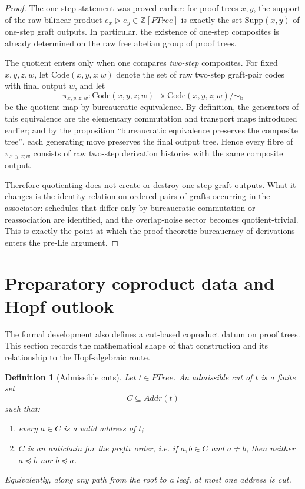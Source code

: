 \documentclass[11pt]{article}
\newtheorem{definition}[theorem]{Definition}
\newcommand{\PTree}{\mathit{PTree}}
\newcommand{\Addr}{\mathit{Addr}}
\begin{document}
\begin{proof}
The one-step statement was proved earlier: for proof trees \(x,y\), the support
of the raw bilinear product \(e_x\triangleright e_y\in \mathbb Z[\PTree]\) is
exactly the set \(\mathrm{Supp}(x,y)\) of one-step graft outputs. In
particular, the existence of one-step composites is already determined on the
raw free abelian group of proof trees.

The quotient enters only when one compares \emph{two-step} composites. For
fixed \(x,y,z,w\), let \(\mathrm{Code}(x,y,z;w)\) denote the set of raw
two-step graft-pair codes with final output \(w\), and let
\[
\pi_{x,y,z;w}:\mathrm{Code}(x,y,z;w)\twoheadrightarrow
\mathrm{Code}(x,y,z;w)/{\sim_{\mathrm b}}
\]
be the quotient map by bureaucratic equivalence. By definition, the generators
of this equivalence are the elementary commutation and transport maps introduced
earlier; and by the proposition ``bureaucratic equivalence preserves the
composite tree'', each generating move preserves the final output tree. Hence
every fibre of \(\pi_{x,y,z;w}\) consists of raw two-step derivation histories
with the same composite output.

Therefore quotienting does not create or destroy one-step graft outputs. What it
changes is the identity relation on ordered pairs of grafts occurring in the
associator: schedules that differ only by bureaucratic commutation or
reassociation are identified, and the overlap-noise sector becomes
quotient-trivial. This is exactly the point at which the proof-theoretic
bureaucracy of derivations enters the pre-Lie argument.
\end{proof}

\section{Preparatory coproduct data and Hopf outlook}

The formal development also defines a cut-based coproduct datum on proof trees.
This section records the mathematical shape of that construction and its
relationship to the Hopf-algebraic route.

\begin{definition}[Admissible cuts]
Let \(t\in\PTree\). An \emph{admissible cut} of \(t\) is a finite set
\[
C\subseteq \Addr(t)
\]
such that:
\begin{enumerate}[label=\textup{(\roman*)}]
\item every \(a\in C\) is a valid address of \(t\);
\item \(C\) is an antichain for the prefix order, i.e. if \(a,b\in C\) and
\(a\neq b\), then neither \(a\preceq b\) nor \(b\preceq a\).
\end{enumerate}
Equivalently, along any path from the root to a leaf, at most one address is
cut.
\end{definition}
\end{document}
